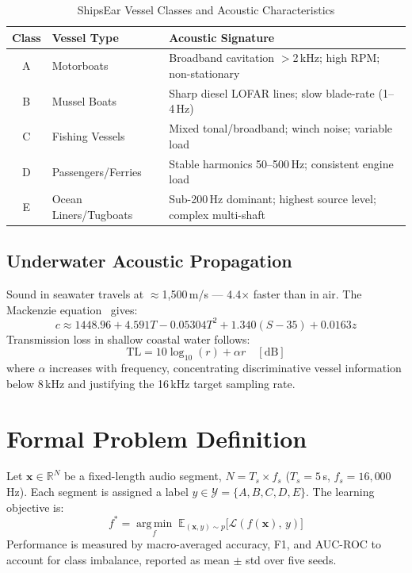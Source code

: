 \documentclass[conference]{IEEEtran}
\begin{document}
\begin{table}[t]
  \caption{ShipsEar Vessel Classes and Acoustic Characteristics}
  \label{tab:classes}
  \centering
  \setlength{\tabcolsep}{3pt}
  \begin{tabular}{clp{4.0cm}}
    \toprule
    \textbf{Class} & \textbf{Vessel Type} & \textbf{Acoustic Signature} \\
    \midrule
    A & Motorboats            & Broadband cavitation $>$2\,kHz; high RPM; non-stationary \\
    B & Mussel Boats          & Sharp diesel LOFAR lines; slow blade-rate (1--4\,Hz) \\
    C & Fishing Vessels       & Mixed tonal/broadband; winch noise; variable load \\
    D & Passengers/Ferries    & Stable harmonics 50--500\,Hz; consistent engine load \\
    E & Ocean Liners/Tugboats & Sub-200\,Hz dominant; highest source level; complex multi-shaft \\
    \bottomrule
  \end{tabular}
\end{table}

\subsection{Underwater Acoustic Propagation}

Sound in seawater travels at $\approx$1{,}500\,m/s --- 4.4$\times$ faster
than in air. The Mackenzie equation~\cite{mackenzie1981} gives:
\begin{equation}
  c \approx 1448.96 + 4.591T - 0.05304T^2 + 1.340(S-35) + 0.0163z
  \label{eq:mackenzie}
\end{equation}
Transmission loss in shallow coastal water follows:
\begin{equation}
  \mathrm{TL} = 10\log_{10}(r) + \alpha r \quad [\mathrm{dB}]
  \label{eq:tl}
\end{equation}
where $\alpha$ increases with frequency, concentrating discriminative vessel
information below 8\,kHz and justifying the 16\,kHz target sampling rate.

\section{Formal Problem Definition}

Let $\mathbf{x}\in\mathbb{R}^{N}$ be a fixed-length audio segment,
$N = T_s \times f_s$ ($T_s = 5$\,s, $f_s = 16{,}000$\,Hz). Each segment
is assigned a label $y \in \mathcal{Y} = \{A,B,C,D,E\}$.
The learning objective is:
\begin{equation}
  f^* = \operatorname*{arg\,min}_{f}\;
        \mathbb{E}_{(\mathbf{x},y)\sim p}\!
        \bigl[\mathcal{L}(f(\mathbf{x}),\,y)\bigr]
  \label{eq:objective}
\end{equation}
Performance is measured by macro-averaged accuracy, F1, and AUC-ROC to
account for class imbalance, reported as mean $\pm$ std over five seeds.
\end{document}
